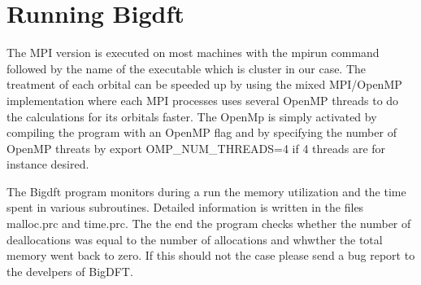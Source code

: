 \documentclass[a4paper,11pt]{report}
\begin{document}
\chapter{ \bf Running Bigdft}
The MPI version is executed on most machines with the mpirun command followed by the name of the executable which is 
cluster in our case.
The treatment of each orbital can be speeded up by using the mixed MPI/OpenMP implementation 
where each MPI processes uses several OpenMP threads to do the calculations for its orbitals faster. 
The OpenMp is simply activated by compiling the program with an OpenMP flag and by specifying the number of OpenMP threats by
export OMP\_NUM\_THREADS=4 if 4 threads are for instance desired.

\noindent
The Bigdft program monitors during a run the memory utilization and the time spent in various subroutines. Detailed information 
is written in the files malloc.prc and time.prc. The the end the program checks whether the number of deallocations was equal 
to the number of allocations and whwther the total memory went back to zero. If this should not the case please send a bug report 
to the develpers of BigDFT. 
\end{document}
